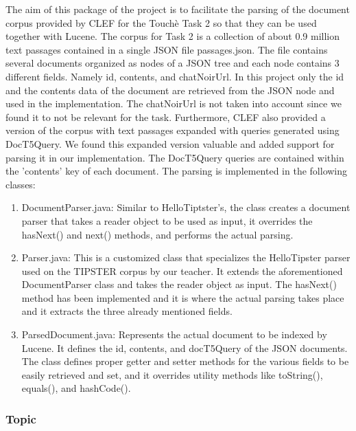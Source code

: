             The aim of this package of the project is to facilitate the parsing of the document corpus provided by CLEF for the Touchè Task 2 so that they can be used together with Lucene. The corpus for Task 2 is a collection of about 0.9 million text passages contained in a single JSON file passages.json. The file contains several documents organized as nodes of a JSON tree and each node contains 3 different fields. Namely id, contents, and chatNoirUrl. In this project only the id and the contents data of the document are retrieved from the JSON node and used in the implementation. The chatNoirUrl is not taken into account since we found it to not be relevant for the task. Furthermore, CLEF also provided a version of the corpus with text passages expanded with queries generated using DocT5Query. We found this expanded version valuable and added support for parsing it in our implementation. The DocT5Query queries are contained within the 'contents' key of each document. The parsing is implemented in the following classes:
            \begin{enumerate}
                \item 
                    DocumentParser.java: Similar to HelloTiptster’s, the class creates a     document parser that takes a reader object to be used as input, it overrides the hasNext() and next() methods, and performs the actual parsing.
                \item 
                    Parser.java: This is a customized class that specializes the HelloTipster parser used on the TIPSTER corpus by our teacher. It extends the aforementioned DocumentParser class and takes the reader object as input. The hasNext() method has been implemented and it is where the actual parsing takes place and it extracts the three already mentioned fields.
                \item
                    ParsedDocument.java: Represents the actual document to be indexed by Lucene. It defines the id, contents, and docT5Query of the JSON documents. The class defines proper getter and setter methods for the various fields to be easily retrieved and set, and it overrides utility methods like toString(), equals(), and hashCode().
            \end{enumerate}
\subsubsection{Topic}
        
